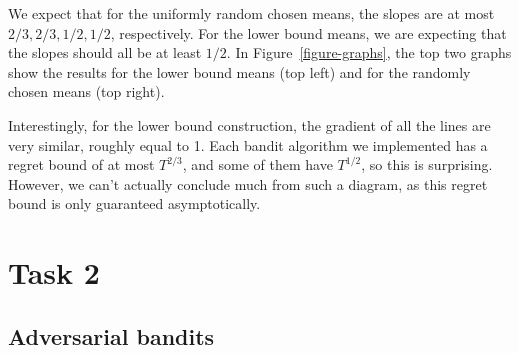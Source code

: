 \documentclass[10pt]{article}
\begin{document}
We expect that for the uniformly random chosen means, the slopes are at most
$2/3, 2/3, 1/2, 1/2$, respectively. For the lower bound means, we are expecting
that the slopes should all be at least $1/2$. In Figure~\ref{figure-graphs}, the
top two graphs show the results for the lower bound means (top left) and for the
randomly chosen means (top right).

Interestingly, for the lower bound construction, the gradient of all the lines
are very similar, roughly equal to 1. Each bandit algorithm we implemented has a
regret bound of at most $T^{2/3}$, and some of them have $T^{1/2}$, so this is
surprising. However, we can't actually conclude much from such a diagram, as
this regret bound is only guaranteed asymptotically.

%

\section{Task 2}

\subsection{Adversarial bandits}
\end{document}
